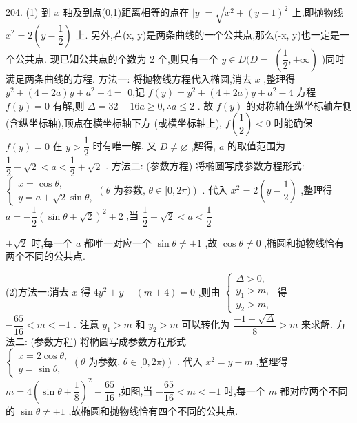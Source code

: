 204. (1) 到 $x$ 轴及到点(0,1)距离相等的点在 $\left| y\right|  = \sqrt{{x}^{2} + {\left( y - 1\right) }^{2}}$ 上,即抛物线 ${x}^{2} = 2\left( {y - \dfrac{1}{2}}\right)$ 上. 另外,若(x, y)是两条曲线的一个公共点,那么(-x, y)也一定是一个公共点. 现已知公共点的个数为 2 个,则只有一个 $y \in  D(D =$  $\left( {\dfrac{1}{2}, + \infty }\right)$ )同时满足两条曲线的方程. 方法一: 将抛物线方程代入椭圆,消去 $x$ ,整理得 ${y}^{2} + \left( {4 - {2a}}\right) y + {a}^{2} - 4 =$ 0,记 $f\left( y\right)  = {y}^{2} + \left( {4 + {2a}}\right) y + {a}^{2} - 4$ 方程 $f\left( y\right)  = 0$ 有解,则 $\Delta  = {32} - {16a} \geq  0,\therefore a \leq  2$ . 故 $f\left( y\right)$ 的对称轴在纵坐标轴左侧 (含纵坐标轴),顶点在横坐标轴下方 (或横坐标轴上), $f\left( \dfrac{1}{2}\right)  < 0$ 时能确保 $f\left( y\right)  = 0$ 在 $y > \dfrac{1}{2}$ 时有唯一解. 又 $D \neq  \varnothing$ ,解得, $a$ 的取值范围为 $\dfrac{1}{2} - \sqrt{2} < a < \dfrac{1}{2} + \sqrt{2}$ . 方法二: (参数方程) 将椭圆写成参数方程形式: $\left\{  {\begin{array}{l} x = \cos \theta , \\  y = a + \sqrt{2}\sin \theta , \end{array}\left( {\theta \text{ 为参数, }\theta  \in  \lbrack 0,{2\pi })}\right) }\right.$ . 代入 ${x}^{2} = 2\left( {y - \dfrac{1}{2}}\right)$ ,整理得 $a =  - \dfrac{1}{2}{\left( \sin \theta  + \sqrt{2}\right) }^{2} + 2$ ,当 $\dfrac{1}{2} - \sqrt{2} < a < \dfrac{1}{2}$

$+ \sqrt{2}$ 时,每一个 $a$ 都唯一对应一个 $\sin \theta  \neq   \pm  1$ ,故 $\cos \theta  \neq  0$ ,椭圆和抛物线恰有两个不同的公共点.

(2)方法一:消去 $x$ 得 $4{y}^{2} + y - \left( {m + 4}\right)  = 0$ ,则由 $\left\{  \begin{array}{l} \Delta  > 0, \\  {y}_{1} > m, \\  {y}_{2} > m, \end{array}\right.$ 得 $- \dfrac{65}{16} < m <  - 1$ . 注意 ${y}_{1} > m$ 和 ${y}_{2} > m$ 可以转化为 $\dfrac{-1 - \sqrt{\Delta }}{8} > m$ 来求解. 方法二: (参数方程) 将椭圆写成参数方程形式 $\left\{  {\begin{array}{l} x = 2\cos \theta , \\  y = \sin \theta , \end{array}\left( {\theta \text{ 为参数, }\theta  \in  \lbrack 0,{2\pi })}\right) }\right.$ . 代入 ${x}^{2} = y - m$ ,整理得 $m = 4{\left( \sin \theta  + \dfrac{1}{8}\right) }^{2} - \dfrac{65}{16}$ ,如图,当 $- \dfrac{65}{16} < m <  - 1$ 时,每一个 $m$ 都对应两个不同的 $\sin \theta  \neq   \pm  1$ ,故椭圆和抛物线恰有四个不同的公共点.


